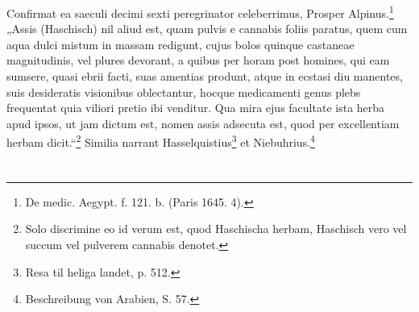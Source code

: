 \documentclass[a4paper, 11pt, oneside, polutonikogreek, german]{article}
\begin{document}
Confirmat ea saeculi decimi sexti peregrinator celeberrimus, Prosper Alpinus.\footnote{De medic. Aegypt. f. 121. b. (Paris 1645. 4).} „Assis (Haschisch) nil aliud est, quam pulvis e cannabis foliis paratus, quem cum aqua dulci mistum in massam redigunt, cujus bolos quinque castaneae magnitudinis, vel plures devorant, a quibus per horam post homines, qui eam sumsere, quasi ebrii facti, suas amentias produnt, atque in ecstasi diu manentes, suis desideratis visionibus oblectantur, hocque medicamenti genus plebs frequentat quia viliori pretio ibi venditur. Qua mira ejus facultate ista herba apud ipsos, ut jam dictum est, nomen assis adsecuta est, quod per excellentiam herbam dicit.“\footnote{Solo discrimine eo id verum est, quod Haschischa herbam, Haschisch vero vel succum vel pulverem cannabis denotet.} Similia narrant Hasselquistius\footnote{Resa til heliga landet, p. 512.} et Niebuhrius.\footnote{Beschreibung von Arabien, S. 57.}
\section{}
\end{document}
